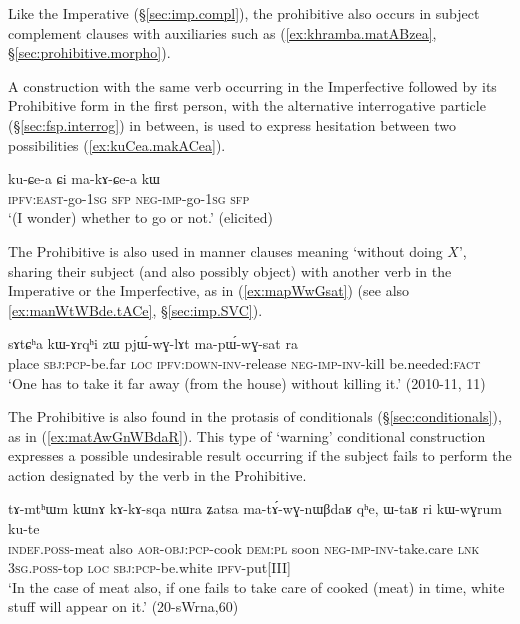 Like the Imperative (§\ref{sec:imp.compl}), the prohibitive also occurs in subject complement clauses with auxiliaries such as  (\ref{ex:khramba.matABzea}, §\ref{sec:prohibitive.morpho}).


A construction with the same verb occurring in the Imperfective followed by its Prohibitive form in the first person, with the alternative interrogative particle  (§\ref{sec:fsp.interrog}) in between, is used to express hesitation between two possibilities (\ref{ex:kuCea.makACea}).

\begin{exe}
\ex  \label{ex:kuCea.makACea}
\gll ku-ɕe-a ɕi ma-kɤ-ɕe-a kɯ \\
\textsc{ipfv}:\textsc{east}-go-\textsc{1sg} \textsc{sfp} \textsc{neg}-\textsc{imp}-go-\textsc{1sg} \textsc{sfp} \\
\glt `(I wonder) whether to go or not.' (elicited)
\end{exe}

The Prohibitive is also used in manner clauses meaning `without doing $X$', sharing their subject (and also possibly object) with another verb in the Imperative or the Imperfective, as in (\ref{ex:mapWwGsat}) (see also \ref{ex:manWtWBde.tACe}, §\ref{sec:imp.SVC}).

\begin{exe}
\ex  \label{ex:mapWwGsat}
\gll  sɤtɕʰa kɯ-ɤrqʰi zɯ pjɯ́-wɣ-lɤt ma-pɯ́-wɣ-sat ra \\
place \textsc{sbj}:\textsc{pcp}-be.far \textsc{loc} \textsc{ipfv}:\textsc{down}-\textsc{inv}-release \textsc{neg}-\textsc{imp}-\textsc{inv}-kill be.needed:\textsc{fact} \\
\glt `One has to take it far away (from the house) without killing it.' (2010-11, 11)
\end{exe}

The Prohibitive is also found in the protasis of conditionals (§\ref{sec:conditionals}), as in (\ref{ex:matAwGnWBdaR}). This type of `warning' conditional construction expresses a possible undesirable result occurring if the subject fails to perform the action designated by the verb in the Prohibitive.

\begin{exe}
\ex  \label{ex:matAwGnWBdaR}
\gll  tɤ-mtʰɯm kɯnɤ kɤ-kɤ-sqa nɯra ʑatsa ma-tɤ́-wɣ-nɯβdaʁ qʰe, ɯ-taʁ ri kɯ-wɣrum ku-te \\
\textsc{indef}.\textsc{poss}-meat also \textsc{aor}-\textsc{obj}:\textsc{pcp}-cook \textsc{dem}:\textsc{pl} soon \textsc{neg}-\textsc{imp}-\textsc{inv}-take.care \textsc{lnk} \textsc{3sg}.\textsc{poss}-top \textsc{loc} \textsc{sbj}:\textsc{pcp}-be.white \textsc{ipfv}-put[III] \\
\glt `In the case of meat also, if one fails to take care of cooked (meat) in time, white stuff will appear on it.' (20-sWrna,60)
\end{exe}
 
